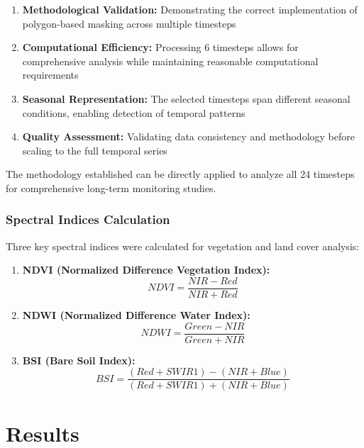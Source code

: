 \documentclass[a4paper,12pt]{article}
\begin{document}
\begin{enumerate}
    \item \textbf{Methodological Validation:} Demonstrating the correct
          implementation of polygon-based masking across multiple timesteps
    \item \textbf{Computational Efficiency:} Processing 6 timesteps allows for
          comprehensive analysis while maintaining reasonable computational
          requirements
    \item \textbf{Seasonal Representation:} The selected timesteps span
          different seasonal conditions, enabling detection of temporal patterns
    \item \textbf{Quality Assessment:} Validating data consistency and
          methodology before scaling to the full temporal series
\end{enumerate}

The methodology established can be directly applied to analyze all 24 timesteps
for comprehensive long-term monitoring studies.

\subsubsection{Spectral Indices Calculation}

Three key spectral indices were calculated for vegetation and land cover
analysis:

\begin{enumerate}
    \item \textbf{NDVI (Normalized Difference Vegetation Index):}
          \begin{equation}
              NDVI = \frac{NIR - Red}{NIR + Red}
          \end{equation}

    \item \textbf{NDWI (Normalized Difference Water Index):}
          \begin{equation}
              NDWI = \frac{Green - NIR}{Green + NIR}
          \end{equation}

    \item \textbf{BSI (Bare Soil Index):}
          \begin{equation}
              BSI = \frac{(Red + SWIR1) - (NIR + Blue)}{(Red + SWIR1) + (NIR + Blue)}
          \end{equation}
\end{enumerate}

\section{Results}
\end{document}
